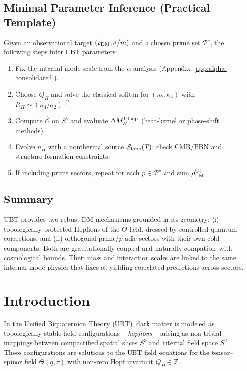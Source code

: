 \documentclass[12pt,a4paper]{article}
\begin{document}
\subsection{Minimal Parameter Inference (Practical Template)}
Given an observational target $(\rho_{\rm DM}, \sigma/m)$ and a chosen prime set $\mathcal{P}^\star$, the following steps infer UBT parameters:
\begin{enumerate}
\item Fix the internal-mode scale from the $\alpha$ analysis (Appendix~\ref{app:alpha-consolidated}).
\item Choose $Q_H$ and solve the classical soliton for $(\kappa_2,\kappa_4)$ with $R_H\!\sim\!(\kappa_4/\kappa_2)^{1/2}$.
\item Compute $\hat{\mathcal{O}}$ on $S^3$ and evaluate $\Delta M_H^{\rm 1\text{-}loop}$ (heat-kernel or phase-shift methods).
\item Evolve $n_H$ with a nonthermal source $\mathcal{S}_{\rm topo}(T)$; check CMB/BBN and structure-formation constraints.
\item If including prime sectors, repeat for each $p\in\mathcal{P}^\star$ and sum $\rho_{\rm DM}^{(p)}$.
\end{enumerate}

\subsection{Summary}
UBT provides two robust DM mechanisms grounded in its geometry: (i) topologically protected Hopfions of the $\Theta$ field, dressed by controlled quantum corrections, and (ii) orthogonal prime/$p$-adic sectors with their own cold components.
Both are gravitationally coupled and naturally compatible with cosmological bounds. Their mass and interaction scales are linked to the same internal-mode physics that fixes $\alpha$, yielding correlated predictions across sectors.


\section*{Introduction}
In the Unified Biquaternion Theory (UBT), dark matter is modeled as topologically stable field configurations – \emph{hopfions} – arising as non-trivial mappings between compactified spatial slices \(S^3\) and internal field space \(S^2\). These configurations are solutions to the UBT field equations for the tensor–spinor field \(\Theta(q,\tau)\) with non-zero Hopf invariant \(Q_H \in \mathbb{Z}\).
\end{document}
